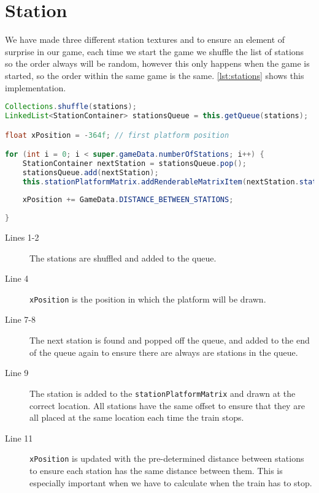 \section{Station}

We have made three different station textures and to ensure an element of surprise in our game, each time we start the game we shuffle the list of stations so the order always will be random, however this only happens when the game is started, so the order within the same game is the same. \autoref{lst:stations} shows this implementation.
 
\begin{lstlisting}[language=java,firstnumber=1,caption={Placing the station correctly.},label=lst:stations]
Collections.shuffle(stations);
LinkedList<StationContainer> stationsQueue = this.getQueue(stations);

float xPosition = -364f; // first platform position

for (int i = 0; i < super.gameData.numberOfStations; i++) {
    StationContainer nextStation = stationsQueue.pop();
    stationsQueue.add(nextStation);
    this.stationPlatformMatrix.addRenderableMatrixItem(nextStation.station, new Coordinate(xPosition + nextStation.xOffset, nextStation.yOffset, 0f));
    
    xPosition += GameData.DISTANCE_BETWEEN_STATIONS;        
    
}
\end{lstlisting}

\begin{description}
\item[Lines 1-2]  The stations are shuffled and added to the queue.
\item[Line 4] \lstinline|xPosition| is the position in which the platform will be drawn. 
\item[Line 7-8] The next station is found and popped off the queue, and added to the end of the queue again to ensure there are always are stations in the queue. 
\item[Line 9] The station is added to the \lstinline|stationPlatformMatrix| and drawn at the correct location. All stations have the same offset to ensure that they are all placed at the same location each time the train stops. 
\item[Line 11] \lstinline|xPosition| is updated with the pre-determined distance between stations to ensure each station has the same distance between them. This is especially important when we have to calculate when the train has to stop. 
\end{description}

